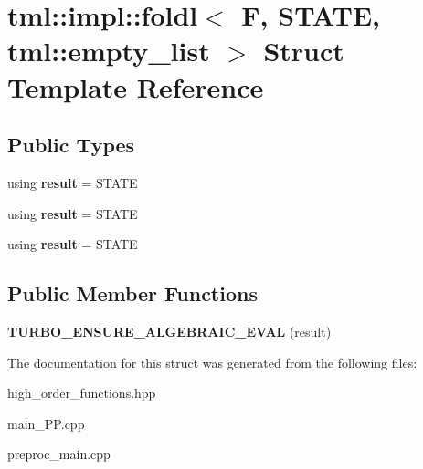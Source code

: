 \hypertarget{structtml_1_1impl_1_1foldl_3_01F_00_01STATE_00_01tml_1_1empty__list_01_4}{\section{tml\+:\+:impl\+:\+:foldl$<$ F, S\+T\+A\+T\+E, tml\+:\+:empty\+\_\+list $>$ Struct Template Reference}
\label{structtml_1_1impl_1_1foldl_3_01F_00_01STATE_00_01tml_1_1empty__list_01_4}
}
\subsection*{Public Types}
\begin{DoxyCompactItemize}
\item 
\hypertarget{structtml_1_1impl_1_1foldl_3_01F_00_01STATE_00_01tml_1_1empty__list_01_4_a5071702ae4c92b3a0c0b079d2bfafa45}{using {\bfseries result} = S\+T\+A\+T\+E}\label{structtml_1_1impl_1_1foldl_3_01F_00_01STATE_00_01tml_1_1empty__list_01_4_a5071702ae4c92b3a0c0b079d2bfafa45}

\item 
\hypertarget{structtml_1_1impl_1_1foldl_3_01F_00_01STATE_00_01tml_1_1empty__list_01_4_a5071702ae4c92b3a0c0b079d2bfafa45}{using {\bfseries result} = S\+T\+A\+T\+E}\label{structtml_1_1impl_1_1foldl_3_01F_00_01STATE_00_01tml_1_1empty__list_01_4_a5071702ae4c92b3a0c0b079d2bfafa45}

\item 
\hypertarget{structtml_1_1impl_1_1foldl_3_01F_00_01STATE_00_01tml_1_1empty__list_01_4_a5071702ae4c92b3a0c0b079d2bfafa45}{using {\bfseries result} = S\+T\+A\+T\+E}\label{structtml_1_1impl_1_1foldl_3_01F_00_01STATE_00_01tml_1_1empty__list_01_4_a5071702ae4c92b3a0c0b079d2bfafa45}

\end{DoxyCompactItemize}
\subsection*{Public Member Functions}
\begin{DoxyCompactItemize}
\item 
\hypertarget{structtml_1_1impl_1_1foldl_3_01F_00_01STATE_00_01tml_1_1empty__list_01_4_ade1b5f01c79c52a87aae3383ab2aede6}{{\bfseries T\+U\+R\+B\+O\+\_\+\+E\+N\+S\+U\+R\+E\+\_\+\+A\+L\+G\+E\+B\+R\+A\+I\+C\+\_\+\+E\+V\+A\+L} (result)}\label{structtml_1_1impl_1_1foldl_3_01F_00_01STATE_00_01tml_1_1empty__list_01_4_ade1b5f01c79c52a87aae3383ab2aede6}

\end{DoxyCompactItemize}


The documentation for this struct was generated from the following files\+:\begin{DoxyCompactItemize}
\item 
high\+\_\+order\+\_\+functions.\+hpp\item 
main\+\_\+\+P\+P.\+cpp\item 
preproc\+\_\+main.\+cpp\end{DoxyCompactItemize}
